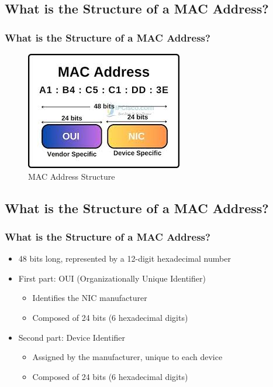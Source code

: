 \documentclass[
english,
svgnames,
notes=hide,
12pt]{beamer}
\begin{document}
\begin{frame}
  \section{What is the Structure of a MAC Address?}
  \frametitle{What is the Structure of a MAC Address?}
	\begin{figure}
    \includegraphics[width=0.5\linewidth]{pictures/mac.jpeg}
		\caption{MAC Address Structure}
	\end{figure}
\end{frame}


\begin{frame}
  \section{What is the Structure of a MAC Address?}
  \frametitle{What is the Structure of a MAC Address?}
  \begin{itemize}
    \item 48 bits long, represented by a 12-digit hexadecimal number \pause
    \item First part: OUI (Organizationally Unique Identifier) \pause
      \begin{itemize}
        \item Identifies the NIC manufacturer \pause
        \item Composed of 24 bits (6 hexadecimal digits) \pause
      \end{itemize}
    \item Second part: Device Identifier \pause
      \begin{itemize}
        \item Assigned by the manufacturer, unique to each device \pause
        \item Composed of 24 bits (6 hexadecimal digits) 
      \end{itemize}
  \end{itemize}
\end{frame}
\end{document}
